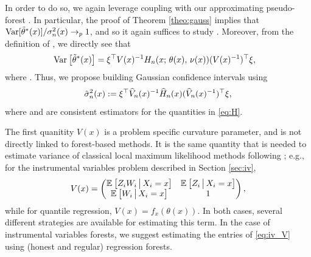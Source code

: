 \documentclass[aos]{imsart}
\theoremstyle{plain}
\theoremstyle{definition}
\theoremstyle{remark}
\begin{document}
\begin{CJK}{UTF8}{gbsn}
In order to do so, we again leverage coupling with our approximating pseudo-forest .
In particular, the proof of Theorem \ref{theo:gauss} implies that 
$\text{Var}[\tilde{\theta}^*(x)]/\sigma^2_n(x) \rightarrow_p 1$, and so it again suffices to study
 . Moreover, from the definition of , we directly see that
\begin{equation}
\label{eq:H}
\begin{split}
&\Var{\ttheta^*(x)} = \xi^\top V(x)^{-1} H_n(x; \, \theta(x), \, \nu(x)) (V(x)^{-1})^\top \xi,
\end{split}
\end{equation}
where .
Thus, we propose building Gaussian confidence intervals using
\begin{equation}
\label{eq:sigma_hat}
\hsigma_n^2(x) := \xi^\top \hV_n(x)^{-1} \hH_n(x) (\hV_n(x)^{-1})^\top \xi,
\end{equation}
where  and  are consistent estimators
for the quantities in \eqref{eq:H}.

The first quanitity $V(x)$ is a problem specific curvature parameter, and is
not directly linked to forest-based methods. It is the same quantity that is needed
to estimate variance of classical local maximum likelihood methods following \citet{newey1994kernel};
e.g., for the instrumental variables problem described in Section \ref{sec:iv},
\begin{equation}
\label{eq:iv_V}
V(x) = \begin{pmatrix}
\EE{Z_iW_i\cond X_i = x} & \EE{Z_i\cond X_i = x} \\
\EE{W_i\cond X_i = x} & 1
\end{pmatrix},
\end{equation}
while for quantile regression, $V(x) = f_x(\theta(x))$.  In both cases,
several different strategies are available for estimating this term. In the
case of instrumental variables forests, we suggest estimating the
entries of \eqref{eq:iv_V} using (honest and regular) regression forests.


\end{CJK}
\end{document}
